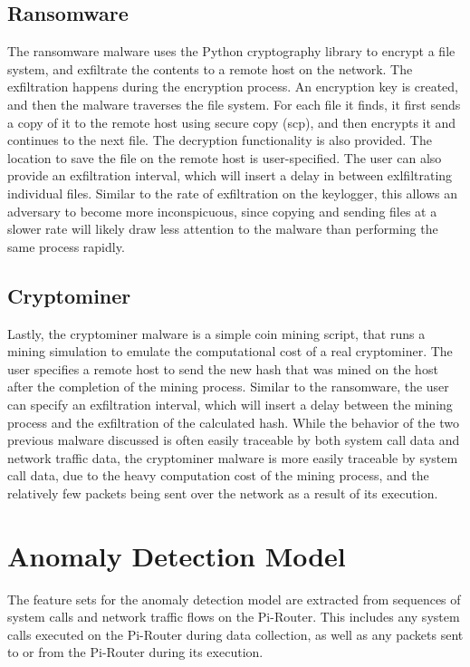 \documentclass[runningheads]{llncs}
\begin{document}
\subsection{Ransomware}
The ransomware malware uses the Python cryptography library to encrypt a file system, and exfiltrate the contents to a remote host on the network. The exfiltration happens during the encryption process. An encryption key is created, and then the malware traverses the file system. For each file it finds, it first sends a copy of it to the remote host using secure copy (scp), and then encrypts it and continues to the next file. The decryption functionality is also provided. The location to save the file on the remote host is user-specified. The user can also provide an exfiltration interval, which will insert a delay in between exlfiltrating individual files. Similar to the rate of exfiltration on the keylogger, this allows an adversary to become more inconspicuous, since copying and sending files at a slower rate will likely draw less attention to the malware than performing the same process rapidly. 

\subsection{Cryptominer}
Lastly, the cryptominer malware is a simple coin mining script, that runs a mining simulation to emulate the computational cost of a real cryptominer. The user specifies a remote host to send the new hash that was mined on the host after the completion of the mining process. Similar to the ransomware, the user can specify an exfiltration interval, which will insert a delay between the mining process and the exfiltration of the calculated hash. While the behavior of the two previous malware discussed is often easily traceable by both system call data and network traffic data, the cryptominer malware is more easily traceable by system call data, due to the heavy computation cost of the mining process, and the relatively few packets being sent over the network as a result of its execution.

\section{Anomaly Detection Model}
The feature sets for the anomaly detection model are extracted from sequences of system calls and network traffic flows on the Pi-Router. This includes any system calls executed on the Pi-Router during data collection, as well as any packets sent to or from the Pi-Router during its execution.
\end{document}

